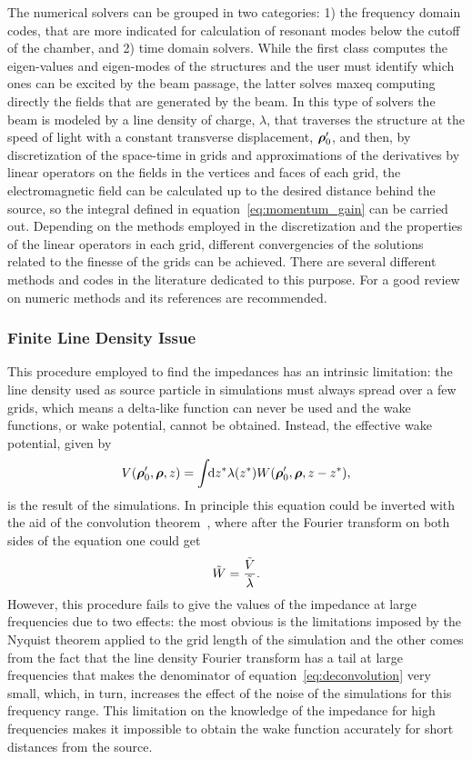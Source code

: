     The numerical solvers can be grouped in two categories: 1) the frequency domain codes, that are more indicated for calculation of resonant modes below the cutoff of the chamber, and 2) time domain solvers. While the first class computes the eigen-values and eigen-modes of the structures and the user must identify which ones can be excited by the beam passage, the latter solves \gls{maxeq} computing directly the fields that are generated by the beam. In this type of solvers the beam is modeled by a line density of charge, $\lambda$, that traverses the structure at the speed of light with a constant transverse displacement, $\boldsymbol{\rho}'_0$, and then, by discretization of the space-time in grids and approximations of the derivatives by linear operators on the fields in the vertices and faces of each grid, the electromagnetic field can be calculated up to the desired distance behind the source, so the integral defined in equation~\eqref{eq:momentum_gain} can be carried out. Depending on the methods employed in the discretization and the properties of the linear operators in each grid, different convergencies of the solutions related to the finesse of the grids can be achieved. There are several different methods and codes in the literature dedicated to this purpose. For a good review on numeric methods  and its references are recommended.

\subsubsection{Finite Line Density Issue}

    This procedure employed to find the impedances has an intrinsic limitation: the line density used as source particle in simulations must always spread over a few grids, which means a delta-like function can never be used and the wake functions, or wake potential, cannot be obtained. Instead, the effective wake potential, given by
    \begin{align}
        V(\boldsymbol{\rho}'_0, \boldsymbol{\rho}, z) = \int\!\!\text{d}z^* 
                \lambda(z^*) W(\boldsymbol{\rho}'_0,\boldsymbol{\rho},z-z^*),
    \end{align}
    is the result of the simulations. In principle this equation could be inverted with the aid of the convolution theorem~\cite{wiki2017a}, where after the Fourier transform on both sides of the equation one could get
    \begin{align}\label{eq:deconvolution}
        \tilde{W} = \frac{\tilde{V}}{\tilde{\lambda}}.
    \end{align}
    However, this procedure fails to give the values of the impedance at large frequencies due to two effects: the most obvious is the limitations imposed by the Nyquist theorem applied to the grid length of the simulation and the other comes from the fact that the line density Fourier transform has a tail at large frequencies that makes the denominator of equation~\eqref{eq:deconvolution} very small, which, in turn, increases the effect of the noise of the simulations for this frequency range. This limitation on the knowledge of the impedance for high frequencies makes it impossible to obtain the wake function accurately for short distances from the source.

